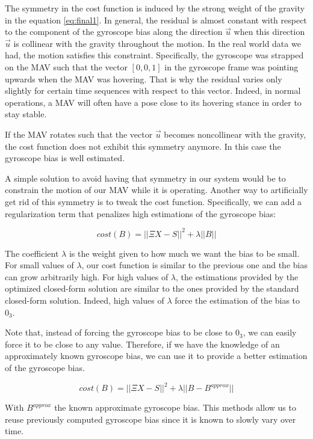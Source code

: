\documentclass[letterpaper, 10 pt, conference]{ieeeconf}  %
\begin{document}
The symmetry in the cost function is induced by the strong weight of the gravity in the equation \ref{eq:final1}.
In general, the residual is almost constant with respect to the component of the gyroscope bias along the direction $\vec{u}$ when this direction $\vec{u}$ is collinear with the gravity throughout the motion.
In the real world data we had, the motion satisfies this constraint.
Specifically, the gyroscope was strapped on the MAV such that the vector $[0,0,1]$ in the gyroscope frame was pointing upwards when the MAV was hovering.
That is why the residual varies only slightly for certain time sequences with respect to this vector.
Indeed, in normal operations, a MAV will often have a pose close to its hovering stance in order to stay stable.

If the MAV rotates such that the vector $\vec{u}$ becomes noncollinear with the gravity, the cost function does not exhibit this symmetry anymore.
In this case the gyroscope bias is well estimated.

A simple solution to avoid having that symmetry in our system would be to constrain the motion of our MAV while it is operating.
Another way to artificially get rid of this symmetry is to tweak the cost function.
Specifically, we can add a regularization term that penalizes high estimations of the gyroscope bias:

\begin{equation}
cost(B) = ||\Xi X - S||^2 + \lambda ||B||
\end{equation}

The coefficient $\lambda$ is the weight given to how much we want the bias to be small.
For small values of $\lambda$, our cost function is similar to the previous one and the bias can grow arbitrarily high.
For high values of $\lambda$, the estimations provided by the optimized closed-form solution are similar to the ones provided by the standard closed-form solution.
Indeed, high values of $\lambda$ force the estimation of the bias to $0_3$.

Note that, instead of forcing the gyroscope bias to be close to $0_3$, we can easily force it to be close to any value.
Therefore, if we have the knowledge of an approximately known gyroscope bias, we can use it to provide a better estimation of the gyroscope bias.

\[
cost(B) = ||\Xi X - S||^2 + \lambda ||B - B^{approx}||
\]

With $B^{approx}$ the known approximate gyroscope bias.
This methods allow us to reuse previously computed gyroscope bias since it is known to slowly vary over time.
\end{document}

